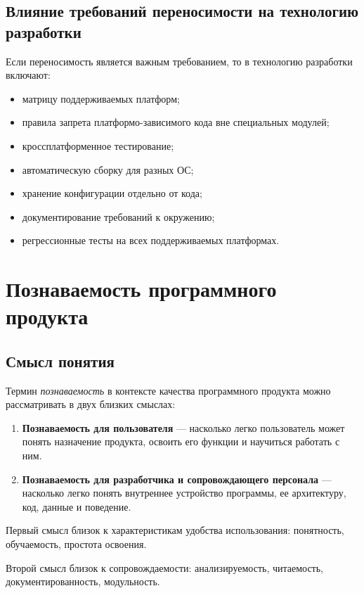 \documentclass[12pt,a4paper]{article}
\begin{document}
\subsection{Влияние требований переносимости на технологию разработки}

Если переносимость является важным требованием, то в технологию разработки включают:
\begin{itemize}
    \item матрицу поддерживаемых платформ;
    \item правила запрета платформо-зависимого кода вне специальных модулей;
    \item кроссплатформенное тестирование;
    \item автоматическую сборку для разных ОС;
    \item хранение конфигурации отдельно от кода;
    \item документирование требований к окружению;
    \item регрессионные тесты на всех поддерживаемых платформах.
\end{itemize}

\section{Познаваемость программного продукта}

\subsection{Смысл понятия}

Термин \emph{познаваемость} в контексте качества программного продукта можно рассматривать в двух близких смыслах:

\begin{enumerate}
    \item \textbf{Познаваемость для пользователя} --- насколько легко пользователь может понять назначение продукта, освоить его функции и научиться работать с ним.
    \item \textbf{Познаваемость для разработчика и сопровождающего персонала} --- насколько легко понять внутреннее устройство программы, ее архитектуру, код, данные и поведение.
\end{enumerate}

Первый смысл близок к характеристикам удобства использования: понятность, обучаемость, простота освоения.

Второй смысл близок к сопровождаемости: анализируемость, читаемость, документированность, модульность.
\end{document}
